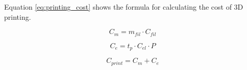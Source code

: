 Equation \ref{eq:printing_cost} shows the formula for calculating the cost of 3D printing.

\begin{equation}
    \label{eq:material_cost}
    C_{m} = m_{fil}\cdot C_{fil}
\end{equation}

\begin{equation}
    \label{eq:energy_cost}
    C_{e} = t_{p}\cdot C_{el}\cdot P
\end{equation}

\begin{equation}
    \label{eq:printing_cost}
    C_{print} = C_{m} + C_{e}
\end{equation}


